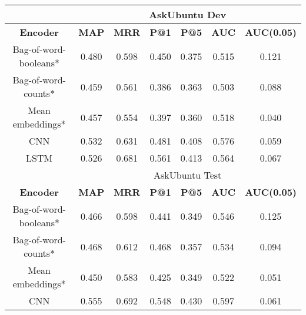 \documentclass[12pt]{article}
\begin{document}
\begin{center}
		\begin{tabular}{|c||c|c|c|c||c|c|}
			\hline
			\cellcolor{gray!15}
				& \multicolumn{6}{c|}{\cellcolor{gray!15}AskUbuntu Dev} \\ \hline
			\cellcolor{gray!15}\textbf{Encoder} & \cellcolor{gray!15}\textbf{MAP} & \cellcolor{gray!15}\textbf{MRR}
				& \cellcolor{gray!15}\textbf{P@1} & \cellcolor{gray!15}\textbf{P@5}
				& \cellcolor{gray!15}\textbf{AUC} & \cellcolor{gray!15}\textbf{AUC(0.05)} \\ \hline\hline
			\cellcolor{red!15}Bag-of-word-booleans* & 0.480 & 0.598 & 0.450 & 0.375 & 0.515 & 0.121 \\ \hline
			\cellcolor{red!15}Bag-of-word-counts* & 0.459 & 0.561 & 0.386 & 0.363 & 0.503 & 0.088 \\ \hline
			\cellcolor{red!15}Mean embeddings* & 0.457 & 0.554 & 0.397 & 0.360 & 0.518 & 0.040 \\ \hline\hline
			\cellcolor{green!15}CNN & 0.532 & 0.631 & 0.481 & 0.408 & 0.576 & 0.059 \\ \hline
			\cellcolor{green!15}LSTM & 0.526 & 0.681 & 0.561 & 0.413 & 0.564 & 0.067 \\ \hline
			\hline
			\cellcolor{gray!15}
				& \multicolumn{6}{c|}{\cellcolor{gray!15}AskUbuntu Test} \\ \hline
			\cellcolor{gray!15}\textbf{Encoder} & \cellcolor{gray!15}\textbf{MAP} & \cellcolor{gray!15}\textbf{MRR}
				& \cellcolor{gray!15}\textbf{P@1} & \cellcolor{gray!15}\textbf{P@5}
				& \cellcolor{gray!15}\textbf{AUC} & \cellcolor{gray!15}\textbf{AUC(0.05)} \\ \hline\hline
			\cellcolor{red!15}Bag-of-word-booleans* & 0.466 & 0.598 & 0.441 & 0.349 & 0.546 & 0.125 \\ \hline
			\cellcolor{red!15}Bag-of-word-counts* & 0.468 & 0.612 & 0.468 & 0.357 & 0.534 & 0.094 \\ \hline
			\cellcolor{red!15}Mean embeddings* & 0.450 & 0.583 & 0.425 & 0.349 & 0.522 & 0.051 \\ \hline\hline
			\cellcolor{green!15}CNN & 0.555 & 0.692 & 0.548 & 0.430 & 0.597 & 0.061 \\ \hline

\end{tabular}
\end{center}
\end{document}
